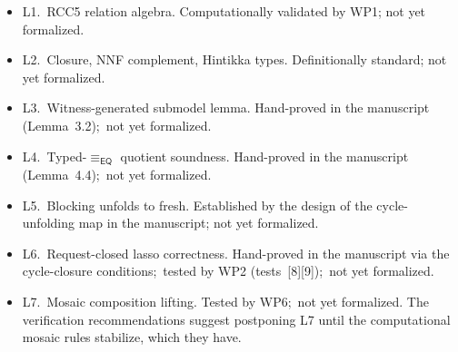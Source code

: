 \documentclass[11pt]{article}
\newcommand{\EQ}{\mathsf{EQ}}
\newcommand{\eqrel}{\equiv_{\EQ}}
\begin{document}
\begin{itemize}[leftmargin=2em]
  \item L1.~RCC5 relation algebra.  Computationally validated by
    WP1; not yet formalized.
  \item L2.~Closure, NNF complement, Hintikka types.  Definitionally
    standard; not yet formalized.
  \item L3.~Witness-generated submodel lemma.  Hand-proved in the
    manuscript (Lemma~3.2);\ not yet formalized.
  \item L4.~Typed-\(\eqrel\) quotient soundness.  Hand-proved in
    the manuscript (Lemma~4.4);\ not yet formalized.
  \item L5.~Blocking unfolds to fresh.  Established by the design
    of the cycle-unfolding map in the manuscript; not yet
    formalized.
  \item L6.~Request-closed lasso correctness.  Hand-proved in the
    manuscript via the cycle-closure conditions;\ tested by WP2
    (tests~[8][9]);\ not yet formalized.
  \item L7.~Mosaic composition lifting.  Tested by WP6;\ not yet
    formalized.  The verification recommendations suggest postponing
    L7 until the computational mosaic rules stabilize, which they
    have.
\end{itemize}
\end{document}
